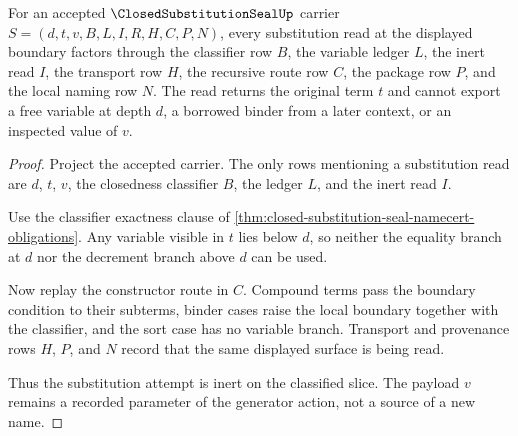 \begin{theorem}
\label{thm:closed-substitution-seal-inert-boundary}
For an accepted $\ClosedSubstitutionSealUp$ carrier $S=(d,t,v,B,L,I,R,H,C,P,N)$, every substitution read at the displayed boundary factors through the classifier row $B$, the variable ledger $L$, the inert read $I$, the transport row $H$, the recursive route row $C$, the package row $P$, and the local naming row $N$. The read returns the original term $t$ and cannot export a free variable at depth $d$, a borrowed binder from a later context, or an inspected value of $v$.
\end{theorem}
\begin{proof}
Project the accepted carrier. The only rows mentioning a substitution read are $d$, $t$, $v$, the closedness classifier $B$, the ledger $L$, and the inert read $I$.

Use the classifier exactness clause of \autoref{thm:closed-substitution-seal-namecert-obligations}. Any variable visible in $t$ lies below $d$, so neither the equality branch at $d$ nor the decrement branch above $d$ can be used.

Now replay the constructor route in $C$. Compound terms pass the boundary condition to their subterms, binder cases raise the local boundary together with the classifier, and the sort case has no variable branch. Transport and provenance rows $H$, $P$, and $N$ record that the same displayed surface is being read.

Thus the substitution attempt is inert on the classified slice. The payload $v$ remains a recorded parameter of the generator action, not a source of a new name.
\end{proof}

